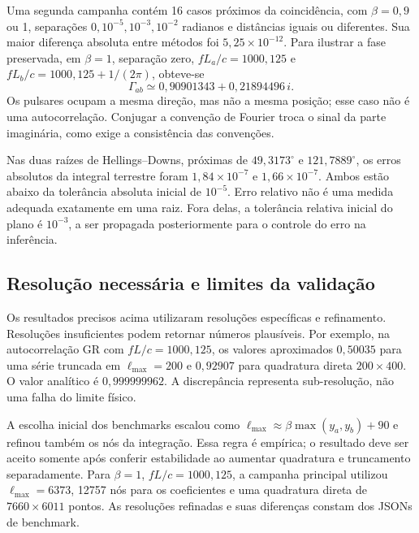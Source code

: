 Uma segunda campanha contém 16 casos próximos da coincidência,
com \(\beta=0{,}9\) ou 1, separações
\(0,10^{-5},10^{-3},10^{-2}\) radianos e distâncias iguais ou
diferentes. Sua maior diferença absoluta entre métodos foi
\(5{,}25\times10^{-12}\). Para ilustrar a fase preservada, em
\(\beta=1\), separação zero,
\(fL_a/c=1000{,}125\) e
\(fL_b/c=1000{,}125+1/(2\pi)\), obteve-se
\begin{equation}
 \Gamma_{ab}\simeq0{,}90901343+0{,}21894496\,i.
 \label{eq:pta-exemplo-complexo}
\end{equation}
Os pulsares ocupam a mesma direção, mas não a mesma posição; esse
caso não é uma autocorrelação. Conjugar a convenção de Fourier troca
o sinal da parte imaginária, como exige a consistência das convenções.

Nas duas raízes de Hellings--Downs, próximas de
\(49{,}3173^\circ\) e \(121{,}7889^\circ\), os erros absolutos
da integral terrestre foram \(1{,}84\times10^{-7}\) e
\(1{,}66\times10^{-7}\). Ambos estão abaixo da tolerância
absoluta inicial de \(10^{-5}\). Erro relativo não é uma medida
adequada exatamente em uma raiz. Fora delas, a tolerância relativa
inicial do plano é \(10^{-3}\), a ser propagada posteriormente
para o controle do erro na inferência.

\subsection{Resolução necessária e limites da validação}

Os resultados precisos acima utilizaram resoluções específicas e
refinamento. Resoluções insuficientes podem retornar números plausíveis. Por exemplo,
na autocorrelação GR
com \(fL/c=1000{,}125\), os valores aproximados
\(0{,}50035\) para uma série truncada em \(\ell_{\max}=200\)
e \(0{,}92907\) para quadratura direta \(200\times400\).
O valor analítico é \(0{,}999999962\). A discrepância representa
sub-resolução, não uma falha do limite físico.

A escolha inicial dos benchmarks escalou como
\(\ell_{\max}\approx\beta\max(y_a,y_b)+90\) e refinou
também os nós da integração. Essa regra é empírica; o resultado deve
ser aceito somente após conferir estabilidade ao aumentar
quadratura e truncamento separadamente. Para
\(\beta=1\), \(fL/c=1000{,}125\), a campanha principal utilizou
\(\ell_{\max}=6373\), 12757 nós para os coeficientes e uma
quadratura direta de \(7660\times6011\) pontos. As resoluções
refinadas e suas diferenças constam dos JSONs de benchmark.

